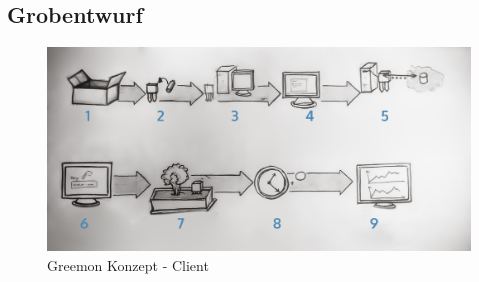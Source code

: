 \documentclass[pointlessnumbers]{scrartcl}
\begin{document}
\subsection{Grobentwurf}

\begin{figure}[htbp] 
  \centering
     \includegraphics[width=1\textwidth]{Skizze_Quickstartguide_numeriert.jpg}
  \caption{Greemon Konzept - Client}
  \label{fig:Bild1}
\end{figure}
\end{document}
